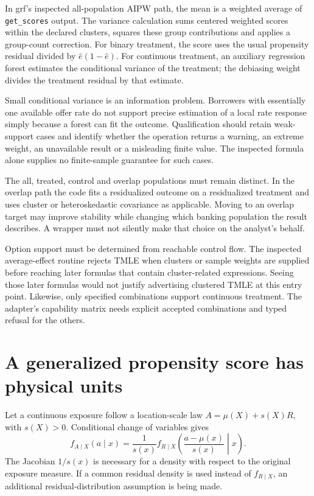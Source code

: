 In grf's inspected all-population AIPW path, the mean is a weighted average of
\texttt{get\_scores} output. The variance calculation sums centered weighted
scores within the declared clusters, squares these group contributions and
applies a group-count correction. For binary treatment, the score uses the
usual propensity residual divided by $\widehat e(1-\widehat e)$. For continuous
treatment, an auxiliary regression forest estimates the conditional variance
of the treatment; the debiasing weight divides the treatment residual by that
estimate. \citep{v131_sw_grf}

Small conditional variance is an information problem. Borrowers with essentially
one available offer rate do not support precise estimation of a local rate
response simply because a forest can fit the outcome. Qualification should
retain weak-support cases and identify whether the operation returns a
warning, an extreme weight, an unavailable result or a misleading finite value.
The inspected formula alone supplies no finite-sample guarantee for such cases.

The all, treated, control and overlap populations must remain distinct. In the
overlap path the code fits a residualized outcome on a residualized treatment
and uses cluster or heteroskedastic covariance as applicable. Moving to an
overlap target may improve stability while changing which banking population
the result describes. A wrapper must not silently make that choice on the
analyst's behalf. \citep{v131_sw_grf}

Option support must be determined from reachable control flow. The inspected
average-effect routine rejects TMLE when clusters or sample weights are supplied
before reaching later formulas that contain cluster-related expressions. Seeing
those later formulas would not justify advertising clustered TMLE at this entry
point. Likewise, only specified combinations support continuous treatment.
The adapter's capability matrix needs explicit accepted combinations and
typed refusal for the others. \citep{v131_sw_grf}

\section{A generalized propensity score has physical units}

Let a continuous exposure follow a location-scale law
$A=\mu(X)+s(X)R$, with $s(X)>0$. Conditional change of variables gives
\[
 f_{A\mid X}(a\mid x)
 =\frac{1}{s(x)}f_{R\mid X}
       \left(\frac{a-\mu(x)}{s(x)}\middle|x\right).
\]
The Jacobian $1/s(x)$ is necessary for a density with respect to the original
exposure measure. If a common residual density is used instead of
$f_{R\mid X}$, an additional residual-distribution assumption is being made.

